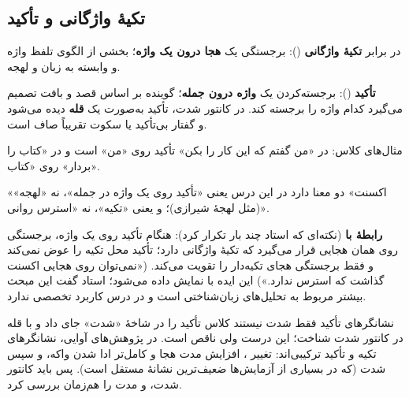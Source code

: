 \subsection{تکیهٔ واژگانی و تأکید}

\begin{definitionbox}{ در برابر }
\textbf{تکیهٔ واژگانی} (): برجستگی یک \textbf{هجا درون یک واژه}؛ بخشی از الگوی تلفظ واژه و وابسته به زبان و لهجه.

\textbf{تأکید} (): برجسته‌کردن یک \textbf{واژه درون جمله}؛ گوینده بر اساس قصد و بافت تصمیم می‌گیرد کدام واژه را برجسته کند. در کانتور شدت، تأکید به‌صورت یک \textbf{قله} دیده می‌شود و گفتار بی‌تأکید یا سکوت تقریباً صاف است.
\end{definitionbox}

مثال‌های کلاس: در «من گفتم که این کار را بکن» تأکید روی «من» است و در «کتاب را بردار» روی «کتاب».

\begin{warningbox}{«اکسنت» دو معنا دارد}
در این درس  یعنی «تأکید روی یک واژه در جمله»، نه «لهجه» (مثل لهجهٔ شیرازی)؛ و  یعنی «تکیه»، نه «استرس روانی».
\end{warningbox}

\textbf{رابطهٔ  با } (نکته‌ای که استاد چند بار تکرار کرد): هنگام تأکید روی یک واژه، برجستگی روی همان هجایی قرار می‌گیرد که تکیهٔ واژگانی دارد؛ تأکید محل تکیه را عوض نمی‌کند و فقط برجستگی هجای تکیه‌دار را تقویت می‌کند. («نمی‌توان روی هجایی اکسنت گذاشت که استرس ندارد.») این ایده با  نمایش داده می‌شود؛ استاد گفت این مبحث بیشتر مربوط به تحلیل‌های زبان‌شناختی است و در درس کاربرد تخصصی ندارد.

\begin{correctionbox}{نشانگرهای تأکید فقط شدت نیستند}
کلاس تأکید را در شاخهٔ «شدت» جای داد و با قله در کانتور شدت شناخت؛ این درست ولی ناقص است. در پژوهش‌های آوایی، نشانگرهای تکیه و تأکید ترکیبی‌اند: تغییر ، افزایش مدت هجا و کامل‌تر ادا شدن واکه، و سپس شدت (که در بسیاری از آزمایش‌ها ضعیف‌ترین نشانهٔ مستقل است). پس باید کانتور شدت،  و مدت را هم‌زمان بررسی کرد.
\end{correctionbox}


